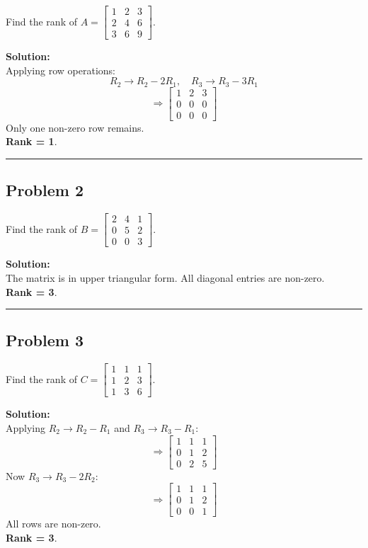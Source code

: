 \documentclass[
  letterpaper,
  DIV=11,
  numbers=noendperiod]{scrreprt}
\begin{document}
Find the rank of
\(A = \begin{bmatrix} 1 & 2 & 3 \\ 2 & 4 & 6 \\ 3 & 6 & 9 \end{bmatrix}.\)

\textbf{Solution:}\\
Applying row operations: \[
R_2 \to R_2 - 2R_1, \quad R_3 \to R_3 - 3R_1
\] \[
\Rightarrow \begin{bmatrix} 1 & 2 & 3 \\ 0 & 0 & 0 \\ 0 & 0 & 0 \end{bmatrix}
\] Only one non-zero row remains.\\
\textbf{Rank = 1}.

\begin{center}\rule{0.5\linewidth}{0.5pt}\end{center}

\subsection{Problem 2}\label{problem-2}

Find the rank of
\(B = \begin{bmatrix} 2 & 4 & 1 \\ 0 & 5 & 2 \\ 0 & 0 & 3 \end{bmatrix}.\)

\textbf{Solution:}\\
The matrix is in upper triangular form. All diagonal entries are
non-zero.\\
\textbf{Rank = 3}.

\begin{center}\rule{0.5\linewidth}{0.5pt}\end{center}

\subsection{Problem 3}\label{problem-3}

Find the rank of
\(C = \begin{bmatrix} 1 & 1 & 1 \\ 1 & 2 & 3 \\ 1 & 3 & 6 \end{bmatrix}.\)

\textbf{Solution:}\\
Applying \(R_2 \to R_2 - R_1\) and \(R_3 \to R_3 - R_1\): \[
\Rightarrow \begin{bmatrix} 1 & 1 & 1 \\ 0 & 1 & 2 \\ 0 & 2 & 5 \end{bmatrix}
\] Now \(R_3 \to R_3 - 2R_2\): \[
\Rightarrow \begin{bmatrix} 1 & 1 & 1 \\ 0 & 1 & 2 \\ 0 & 0 & 1 \end{bmatrix}
\] All rows are non-zero.\\
\textbf{Rank = 3}.
\end{document}
